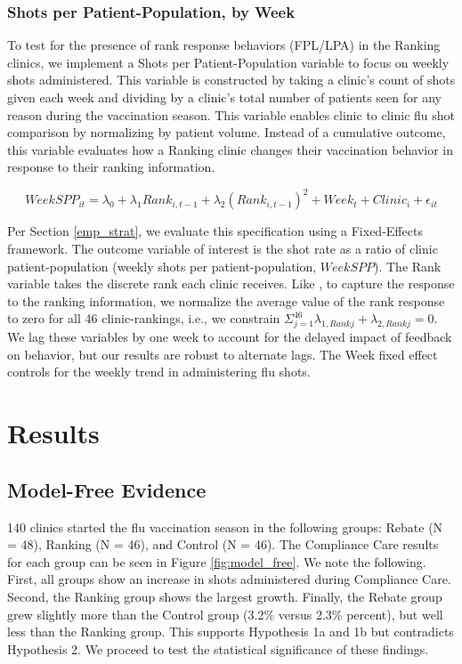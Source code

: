 \begin{onehalfspace}
 \subsubsection{Shots per Patient-Population, by Week}
 To test for the presence of rank response behaviors (FPL/LPA) in the Ranking clinics, we implement a Shots per Patient-Population variable to focus on weekly shots administered. This variable is constructed by taking a clinic’s count of shots given each week and dividing by a clinic’s total number of patients seen for any reason during the vaccination season. This variable enables clinic to clinic flu shot comparison by normalizing by patient volume. Instead of a cumulative outcome, this variable evaluates how a Ranking clinic changes their vaccination behavior in response to their ranking information. 
 
 \begin{equation} \label{rank_resp} %
       WeekSPP_{it} = \lambda_0 + \lambda_1 Rank_{i,t-1} + \lambda_2 (Rank_{i,t-1})^2 + Week_t + Clinic_i + \epsilon_{it}
 \end{equation} 
 
 Per Section \ref{emp_strat}, we evaluate this specification using a Fixed-Effects framework. The outcome variable of interest is the shot rate as a ratio of clinic patient-population (weekly shots per patient-population, $WeekSPP$). The Rank variable takes the discrete rank each clinic receives. Like \cite{Gill2019}, to capture the response to the ranking information, we normalize the average value of the rank response to zero for all 46 clinic-rankings, i.e., we constrain $ \Sigma^{46}_{j=1} \lambda_{1,Rank j} + \lambda_{2,Rank j} = 0$. We lag these variables by one week to account for the delayed impact of feedback on behavior, but our results are robust to alternate lags. The Week fixed effect controls for the weekly trend in administering flu shots.
 
\section{Results} \label{Results}
 \subsection{Model-Free Evidence}
 140 clinics started the flu vaccination season in the following groups: Rebate (N = 48), Ranking (N = 46), and Control (N = 46).  The Compliance Care results for each group can be seen in Figure \ref{fig:model_free}. We note the following. First, all groups show an increase in shots administered during Compliance Care. Second, the Ranking group shows the largest growth. Finally, the Rebate group grew slightly more than the Control group (3.2\% versus 2.3\% percent), but well less than the Ranking group. This supports Hypothesis 1a and 1b but contradicts Hypothesis 2. We proceed to test the statistical significance of these findings.
 

\end{onehalfspace}
